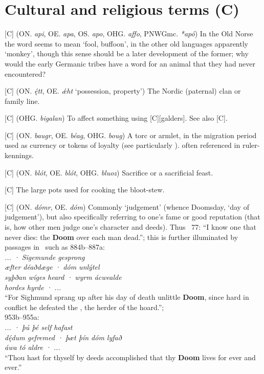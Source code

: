 
\section{Cultural and religious terms (C)}
\begin{itemize}

[C] (ON. \emph{api}, OE. \emph{apa}, OS. \emph{apo}, OHG. \emph{affo}, PNWGmc. \emph{*apó})
  In the Old Norse the word seems to mean ‘fool, buffoon’, in the other old languages apparently ‘monkey’, though this sense should be a later development of the former; why would the early Germanic tribes have a word for an animal that they had never encountered?

[C] (ON. \emph{ę́tt}, OE. \emph{ǽht} ‘possession, property’)
  The Nordic (paternal) clan or family line.

[C] (OHG. \emph{bigalan})
  To affect something using [C][galders]. See also [C].

[C] (ON. \emph{baugr}, OE. \emph{béag}, OHG. \emph{boug})
  A torc or armlet, in the migration period used as currency or tokens of loyalty (see particularly \Hildebrandslied). often referenced in ruler-kennings.

[C] (ON. \emph{blót}, OE. \emph{blót}, OHG. \emph{bluoz})
  Sacrifice or a sacrificial feast.

[C]
  The large pots used for cooking the bloot-stew.

[C] (ON. \emph{dómr}, OE. \emph{dóm})
  Commonly ‘judgement’ (whence Doomsday, ‘day of judgement’), but also specifically referring to one’s fame or good reputation (that is, how other men judge one’s character and deeds). Thus \Havamal\ 77: “I know one that never dies: the \textbf{Doom} over each man dead.”; this is further illuminated by passages in \Beowulf\ such as 884b–887a: \\ \emph{... · Sigemunde gesprong \\ æfter déaðdæge · dóm unlýtel \\ syþðan wíges heard · wyrm ácwealde \\ hordes hyrde · ...} \\ “For Sighmund sprang up after his day of death unlittle \textbf{Doom}, since hard in conflict he defeated the , the herder of the hoard.”; \\ 953b–955a: \\ \emph{... · þú þé self hafast \\ dę́dum gefremed · þæt þín dóm lyfað \\ áwa tó aldre · ...} \\ “Thou hast for thyself by deeds accomplished that thy \textbf{Doom} lives for ever and ever.”


\end{itemize}
